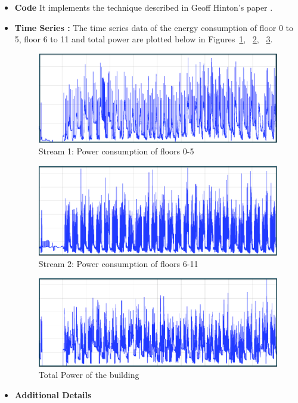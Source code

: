 \documentclass{sig-alternate}
\begin{document}
\begin{itemize}
\item \textbf{ Code } %
It implements the technique described in Geoff Hinton's paper \cite{hinton2000}. 

\item \textbf{ Time Series :} The time series data of the energy consumption of floor 0 to 5, floor 6 to 11 and total power are plotted below in Figures~\ref{fig:flr05}, ~\ref{fig:flr611}, ~\ref{fig:total}.

\begin{figure}[t]
\centering
\includegraphics[width=1.0\textwidth,height=0.15\textheight]{floor052.png}
\caption{Stream 1: Power consumption of floors 0-5}
\label{fig:flr05}
\end{figure}

\begin{figure}[t]
\centering
\includegraphics[width=1.0\textwidth,height=0.15\textheight]{floor6112.png}
\caption{Stream 2: Power consumption of floors 6-11}
\label{fig:flr611}
\end{figure}

\begin{figure}[th]
\centering
\includegraphics[width=1.0\textwidth,height=0.15\textheight]{total2.png}
\caption{Total Power of the building}
\label{fig:total}
\end{figure}


\item \textbf{ Additional Details } 
\end{itemize}
\end{document}
